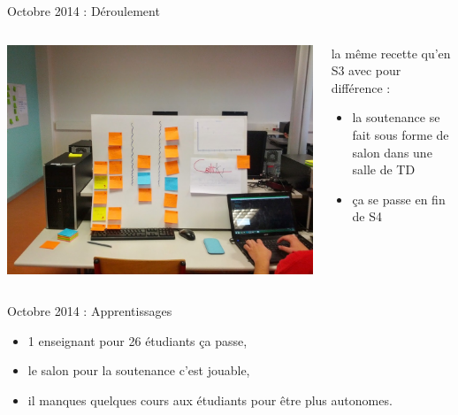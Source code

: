\documentclass{beamer}
\begin{document}
\begin{frame}{Octobre 2014 : Déroulement }
  \begin{columns}
    \begin{column}{0.5\textwidth}
      \begin{center}
        \includegraphics[width=\textwidth]{includes/2014_S4_dashboard.jpg}      
      \end{center}
    \end{column}
    \begin{column}{0.5\textwidth}
      la même recette qu'en S3 avec pour différence : 
      \begin{itemize}
        \item la soutenance se fait sous forme de salon dans une salle de TD
        \item ça se passe en fin de S4
      \end{itemize}
    \end{column}
  \end{columns}
\end{frame}

\begin{frame}{Octobre 2014 : Apprentissages}
  \begin{itemize}
    \item 1 enseignant pour 26 étudiants ça passe,
    \item le salon pour la soutenance c'est jouable,
    \item il manques quelques cours aux étudiants pour être plus autonomes.
  \end{itemize}
\end{frame}
\end{document}
